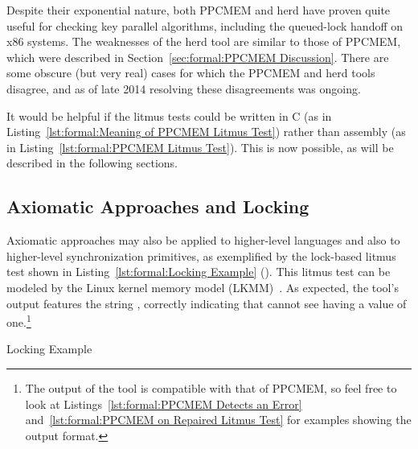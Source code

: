 Despite their exponential nature, both PPCMEM and herd have proven quite
useful for checking key parallel algorithms, including the queued-lock
handoff on x86 systems.
The weaknesses of the herd tool are similar to those of PPCMEM, which
were described in
Section~\ref{sec:formal:PPCMEM Discussion}.
There are some obscure (but very real) cases for which the PPCMEM and
herd tools disagree, and as of late 2014 resolving these disagreements
was ongoing.

It would be helpful if the litmus tests could be written in C
(as in Listing~\ref{lst:formal:Meaning of PPCMEM Litmus Test})
rather than assembly
(as in Listing~\ref{lst:formal:PPCMEM Litmus Test}).
This is now possible, as will be described in the following sections.

\subsection{Axiomatic Approaches and Locking}
\label{sec:formal:Axiomatic Approaches and Locking}

Axiomatic approaches may also be applied to higher-level
languages and also to higher-level synchronization primitives, as
exemplified by the lock-based litmus test shown in
Listing~\ref{lst:formal:Locking Example} ().
This litmus test can be modeled by the Linux kernel memory model
(LKMM)~\cite{Alglave:2018:FSC:3173162.3177156,LucMaranget2018lock.cat}.
As expected, the  tool's output features the string ,
correctly indicating that  cannot see  having a value
of one.\footnote{
	The output of the  tool is compatible with that
	of PPCMEM, so feel free to look at
	Listings~\ref{lst:formal:PPCMEM Detects an Error}
	and~\ref{lst:formal:PPCMEM on Repaired Litmus Test}
	for examples showing the output format.}

\begin{listing}[tb]

\caption{Locking Example}
\label{lst:formal:Locking Example}
\end{listing}

\QuickQuizEnd

